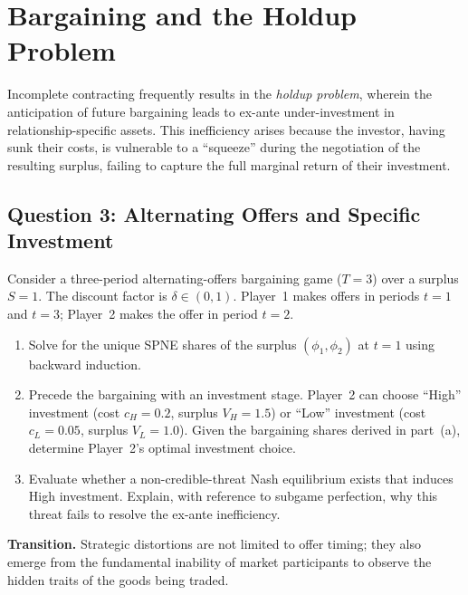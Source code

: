 \documentclass[12pt,a4paper]{article}
\begin{document}

\section{Bargaining and the Holdup Problem}

Incomplete contracting frequently results in the \emph{holdup problem}, wherein the anticipation of
future bargaining leads to ex-ante under-investment in relationship-specific assets. This
inefficiency arises because the investor, having sunk their costs, is vulnerable to a ``squeeze''
during the negotiation of the resulting surplus, failing to capture the full marginal return of
their investment.

\subsection*{Question 3: Alternating Offers and Specific Investment}

Consider a three-period alternating-offers bargaining game (\(T = 3\)) over a surplus \(S = 1\).
The discount factor is \(\delta \in (0,1)\). Player~1 makes offers in periods \(t = 1\) and
\(t = 3\); Player~2 makes the offer in period \(t = 2\).

\begin{enumerate}
  \item Solve for the unique SPNE shares of the surplus \((\phi_1, \phi_2)\) at \(t = 1\) using
        backward induction.
  \item Precede the bargaining with an investment stage. Player~2 can choose ``High'' investment
        (cost \(c_H = 0.2\), surplus \(V_H = 1.5\)) or ``Low'' investment
        (cost \(c_L = 0.05\), surplus \(V_L = 1.0\)). Given the bargaining shares derived in
        part~(a), determine Player~2's optimal investment choice.
  \item Evaluate whether a non-credible-threat Nash equilibrium exists that induces High
        investment. Explain, with reference to subgame perfection, why this threat fails to
        resolve the ex-ante inefficiency.
\end{enumerate}

\bigskip
\noindent\textbf{Transition.}
Strategic distortions are not limited to offer timing; they also emerge from the fundamental
inability of market participants to observe the hidden traits of the goods being traded.
\end{document}
